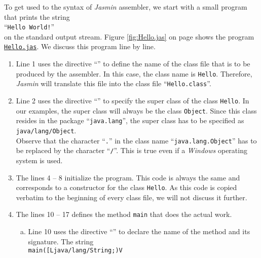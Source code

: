 \noindent
To get used to the syntax of \textsl{Jasmin} assembler, we start with a small program that prints the
string
\\[0.2cm]
\hspace*{1.3cm}
``\texttt{Hello World!}''
\\[0.2cm]
on the standard output stream.  Figure \ref{fig:Hello.jas} on page
\pageref{fig:Hello.jas} shows the program
\href{https://github.com/karlstroetmann/Formal-Languages/tree/master/Jasmin/Hello.jas}{\texttt{Hello.jas}}. 
We discuss this program line by line.
\begin{enumerate}
\item Line 1 uses the directive ``\texttt{}'' to define the name of the class file that is to
      be produced by the assembler.  
      In this case, the class name is \texttt{Hello}.  Therefore, \textsl{Jasmin} will translate
      this file into the class file ``\texttt{Hello.class}''.
\item Line 2 uses the directive ``\texttt{}'' to specify the super class of the class
      \texttt{Hello}.  In our examples, the super class will always be the class \texttt{Object}.
      Since this class resides in the package ``\texttt{java.lang}'', the super class has to be
      specified as 
      \\[0.2cm]
      \hspace*{1.3cm}
      \texttt{java/lang/Object}.
      \\[0.2cm]
      Observe that the character ``\texttt{.}'' in the class name ``\texttt{java.lang.Object}''
      has to be replaced by the character ``\texttt{/}''.  This is true even if a \textsl{Windows}
      operating system is used.
\item The lines 4 -- 8 initialize the program.  This code is always the same and corresponds to a
      constructor for the class \texttt{Hello}.  As this code is copied verbatim to the beginning 
      of every class file, we will not discuss it further. 
\item The lines 10 -- 17 defines the method \texttt{main} that does the actual work.
  \begin{enumerate}[(a)]
  \item Line 10 uses the directive ``\texttt{}'' to declare the name of the method and its
        signature.  The string 
        \\[0.2cm]
        \hspace*{1.3cm}
        \texttt{main([Ljava/lang/String;)V}
        \\[0.2cm]

\end{enumerate}
\end{enumerate}
